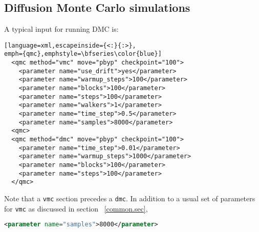 \subsection{Diffusion Monte Carlo simulations}\label{dmc.sec}
A typical input for running DMC is:
\begin{lstlisting}[language=xml,escapeinside={<:}{:>},
emph={qmc},emphstyle=\bfseries\color{blue}]
  <qmc method="vmc" move="pbyp" checkpoint="100">
    <parameter name="use_drift">yes</parameter>
    <parameter name="warmup_steps">100</parameter>
    <parameter name="blocks">100</parameter>
    <parameter name="steps">100</parameter>
    <parameter name="walkers">1</parameter>
    <parameter name="time_step">0.5</parameter>
    <parameter name="samples">8000</parameter>
  <qmc>
  <qmc method="dmc" move="pbyp" checkpoint="100">
    <parameter name="time_step">0.01</parameter>
    <parameter name="warmup_steps">1000</parameter>
    <parameter name="blocks">100</parameter>
    <parameter name="steps">100</parameter>
  </qmc>
\end{lstlisting}

Note that a \texttt{vmc} section precedes a \texttt{dmc}. In addition to
a usual set of parameters for \texttt{vmc} as discussed in section ~\ref{common.sec},
\begin{lstlisting}[language=xml, emph={parameter},emphstyle=\bfseries\color{blue}]
  <parameter name="samples">8000</parameter>
\end{lstlisting}
